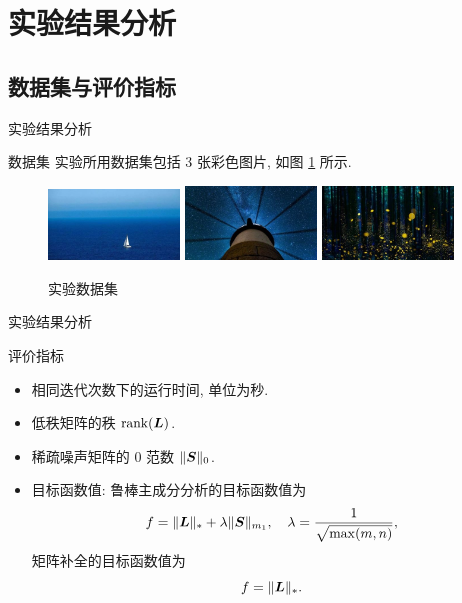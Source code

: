\documentclass{beamer}
\begin{document}
\section{实验结果分析}

\subsection{数据集与评价指标}

\begin{frame}{实验结果分析}
  \begin{block}{数据集}
    实验所用数据集包括 3 张彩色图片, 如图 \ref{fig:data} 所示.
  \end{block}
  \vspace*{1cm}
  \begin{figure}[H]
    \centering
    \includegraphics[width=3.5cm]{1.jpeg}
    \includegraphics[width=3.5cm]{2.jpg}
    \includegraphics[width=3.5cm]{3.jpg}
    \caption{实验数据集}
    \label{fig:data}
  \end{figure}
\end{frame}

\begin{frame}{实验结果分析}
  \begin{block}{评价指标}
    \begin{itemize}
      \item 相同迭代次数下的运行时间, 单位为秒.
      \item 低秩矩阵的秩 $\operatorname{rank}(\bm{L})$.
      \item 稀疏噪声矩阵的 0 范数 $\|\bm{S}\|_0$.
      \item 目标函数值: 鲁棒主成分分析的目标函数值为
      \begin{equation}
        f=\|\bm{L}\|_{*}+\lambda\|\bm{S}\|_{m_1},\quad \lambda=\frac{1}{\sqrt{\max(m,n)}},
      \end{equation}
      矩阵补全的目标函数值为
      \begin{equation}
        f=\|\bm{L}\|_{*}.
      \end{equation}
    \end{itemize}
  \end{block}
\end{frame}
\end{document}
